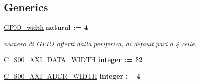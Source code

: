 \subsection*{Generics}
 \begin{DoxyCompactItemize}
\item 
\hypertarget{classmy_g_p_i_o_ga0b52ca75e9a6093b2b60d5e851803069}{\hyperlink{group__my_g_p_i_o_ga0b52ca75e9a6093b2b60d5e851803069}{G\+P\+I\+O\+\_\+width} {\bfseries {\bfseries \textcolor{vhdlchar}{natural}\textcolor{vhdlchar}{ }\textcolor{vhdlchar}{ }\textcolor{vhdlchar}{\+:}\textcolor{vhdlchar}{=}\textcolor{vhdlchar}{ }\textcolor{vhdlchar}{ } \textcolor{vhdldigit}{4} \textcolor{vhdlchar}{ }}}}\label{classmy_g_p_i_o_ga0b52ca75e9a6093b2b60d5e851803069}

\begin{DoxyCompactList}\small\item\em numero di G\+P\+I\+O offerti dalla periferica, di default pari a 4 celle. \end{DoxyCompactList}\item 
\hypertarget{classmy_g_p_i_o_gafce7943994a4ddfa81f224225976a4c7}{\hyperlink{group__my_g_p_i_o_gafce7943994a4ddfa81f224225976a4c7}{C\+\_\+\+S00\+\_\+\+A\+X\+I\+\_\+\+D\+A\+T\+A\+\_\+\+W\+I\+D\+T\+H} {\bfseries {\bfseries \textcolor{vhdlchar}{integer}\textcolor{vhdlchar}{ }\textcolor{vhdlchar}{ }\textcolor{vhdlchar}{\+:}\textcolor{vhdlchar}{=}\textcolor{vhdlchar}{ }\textcolor{vhdlchar}{ } \textcolor{vhdldigit}{32} \textcolor{vhdlchar}{ }}}}\label{classmy_g_p_i_o_gafce7943994a4ddfa81f224225976a4c7}

\item 
\hypertarget{classmy_g_p_i_o_gaa5e5b8ec4a71e3b99ec33afb74cc4970}{\hyperlink{group__my_g_p_i_o_gaa5e5b8ec4a71e3b99ec33afb74cc4970}{C\+\_\+\+S00\+\_\+\+A\+X\+I\+\_\+\+A\+D\+D\+R\+\_\+\+W\+I\+D\+T\+H} {\bfseries {\bfseries \textcolor{vhdlchar}{integer}\textcolor{vhdlchar}{ }\textcolor{vhdlchar}{ }\textcolor{vhdlchar}{\+:}\textcolor{vhdlchar}{=}\textcolor{vhdlchar}{ }\textcolor{vhdlchar}{ } \textcolor{vhdldigit}{4} \textcolor{vhdlchar}{ }}}}\label{classmy_g_p_i_o_gaa5e5b8ec4a71e3b99ec33afb74cc4970}

\end{DoxyCompactItemize}
